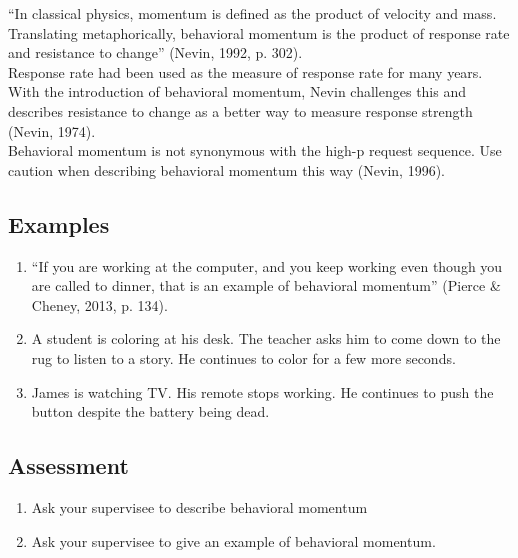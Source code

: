 ``In classical physics, momentum is defined as the product of velocity and mass. Translating metaphorically, behavioral momentum is the product of response rate and resistance to change'' (Nevin, 1992, p. 302).\\

Response rate had been used as the measure of response rate for many years. With the introduction of behavioral momentum, Nevin challenges this and describes resistance to change as a better way to measure response strength (Nevin, 1974).\\

Behavioral momentum is not synonymous with the high-p request sequence. Use caution when describing behavioral momentum this way (Nevin, 1996).\\
%
\subsection{Examples}
\begin{enumerate}
\item ``If you are working at the computer, and you keep working even though you are called to dinner, that is an example of behavioral momentum'' (Pierce \& Cheney, 2013, p. 134).
\item A student is coloring at his desk. The teacher asks him to come down to the rug to listen to a story. He continues to color for a few more seconds.
\item James is watching TV. His remote stops working. He continues to push the button despite the battery being dead.
%
\end{enumerate}
%
\subsection{Assessment}
\begin{enumerate}
\item Ask your supervisee to describe behavioral momentum
\item Ask your supervisee to give an example of behavioral momentum.
%
\end{enumerate}
%
